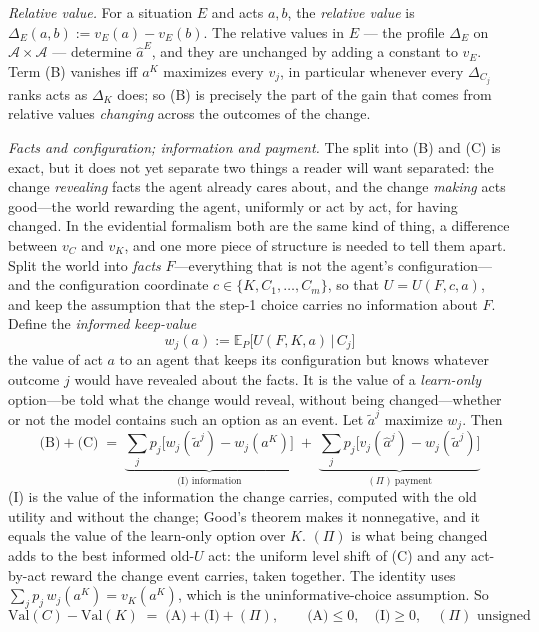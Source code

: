 \documentclass[11pt,a4paper]{article}
\begin{document}
\emph{Relative value.} For a situation $E$ and acts $a, b$, the \emph{relative value} is $\Delta_E(a, b) := v_E(a) - v_E(b)$. The relative values in $E$ --- the profile $\Delta_E$ on $\mathcal A \times \mathcal A$ --- determine $\hat a^E$, and they are unchanged by adding a constant to $v_E$. Term (B) vanishes iff $a^K$ maximizes every $v_j$, in particular whenever every $\Delta_{C_j}$ ranks acts as $\Delta_K$ does; so (B) is precisely the part of the gain that comes from relative values \emph{changing} across the outcomes of the change.

\emph{Facts and configuration; information and payment.} The split into (B) and (C) is exact, but it does not yet separate two things a reader will want separated: the change \emph{revealing} facts the agent already cares about, and the change \emph{making} acts good---the world rewarding the agent, uniformly or act by act, for having changed. In the evidential formalism both are the same kind of thing, a difference between $v_C$ and $v_K$, and one more piece of structure is needed to tell them apart. Split the world into \emph{facts} $F$---everything that is not the agent's configuration---and the configuration coordinate $c \in \{K, C_1, \ldots, C_m\}$, so that $U = U(F, c, a)$, and keep the assumption that the step-1 choice carries no information about $F$. Define the \emph{informed keep-value}
\[
w_j(a) := \mathbb E_P\bigl[ U(F, K, a) \,\big|\, C_j\bigr]
\]
the value of act $a$ to an agent that keeps its configuration but knows whatever outcome $j$ would have revealed about the facts. It is the value of a \emph{learn-only} option---be told what the change would reveal, without being changed---whether or not the model contains such an option as an event. Let $\tilde a^j$ maximize $w_j$. Then
\[
\text{(B)} + \text{(C)} \;=\; \underbrace{\sum_j p_j \bigl[ w_j(\tilde a^j) - w_j(a^K)\bigr]}_{\text{(I) information}} \;+\; \underbrace{\sum_j p_j \bigl[ v_j(\hat a^j) - w_j(\tilde a^j)\bigr]}_{(\Pi)\ \text{payment}}
\]
(I) is the value of the information the change carries, computed with the old utility and without the change; Good's theorem makes it nonnegative, and it equals the value of the learn-only option over $K$. $(\Pi)$ is what being changed adds to the best informed old-$U$ act: the uniform level shift of (C) and any act-by-act reward the change event carries, taken together. The identity uses $\sum_j p_j\, w_j(a^K) = v_K(a^K)$, which is the uninformative-choice assumption. So
\[
\mathrm{Val}(C) - \mathrm{Val}(K) \;=\; \text{(A)} + \text{(I)} + (\Pi), \qquad \text{(A)} \le 0,\quad \text{(I)} \ge 0,\quad (\Pi) \text{ unsigned}
\]
\end{document}
